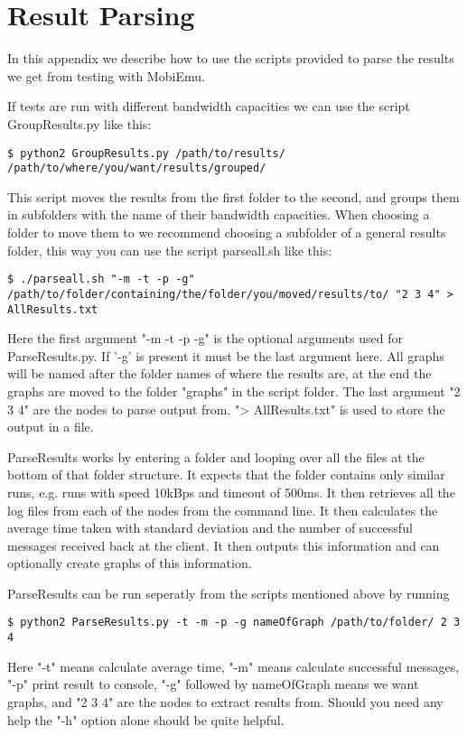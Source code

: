 \section{Result Parsing}\label{Result Parsing}
    In this appendix we describe how to use the scripts provided to parse the results we get from testing with MobiEmu.
    
    If tests are run with different bandwidth capacities we can use the script GroupResults.py like this:
    \lstset{language=bash, style=shell}
    \begin{lstlisting}
$ python2 GroupResults.py /path/to/results/ /path/to/where/you/want/results/grouped/
    \end{lstlisting}
    This script moves the results from the first folder to the second, and groups them in subfolders with the name of their bandwidth capacities. When choosing a folder to move them to we recommend choosing a subfolder of a general results folder, this way you can use the script parseall.sh like this:
    \begin{lstlisting}
$ ./parseall.sh "-m -t -p -g" /path/to/folder/containing/the/folder/you/moved/results/to/ "2 3 4" > AllResults.txt
    \end{lstlisting}
    Here the first argument "-m -t -p -g" is the optional arguments used for ParseResults.py. If '-g' is present it must be the last argument here. All graphs will be named after the folder names of where the results are, at the end the graphs are moved to the folder "graphs" in the script folder. The last argument "2 3 4" are the nodes to parse output from. "> AllResults.txt" is used to store the output in a file.
    
    ParseResults works by entering a folder and looping over all the files at the bottom of that folder structure. It expects that the folder contains only similar runs, e.g. runs with speed 10kBps and timeout of 500ms. It then retrieves all the log files from each of the nodes from the command line. It then calculates the average time taken with standard deviation and the number of successful messages received back at the client. It then outputs this information and can optionally create graphs of this information.
    
    ParseResults can be run seperatly from the scripts mentioned above by running
    \begin{lstlisting}
$ python2 ParseResults.py -t -m -p -g nameOfGraph /path/to/folder/ 2 3 4
    \end{lstlisting}
    Here "-t" means calculate average time, "-m" means calculate successful messages, "-p" print result to console, "-g" followed by nameOfGraph means we want graphs, and "2 3 4" are the nodes to extract results from. Should you need any help the "-h" option alone should be quite helpful.
